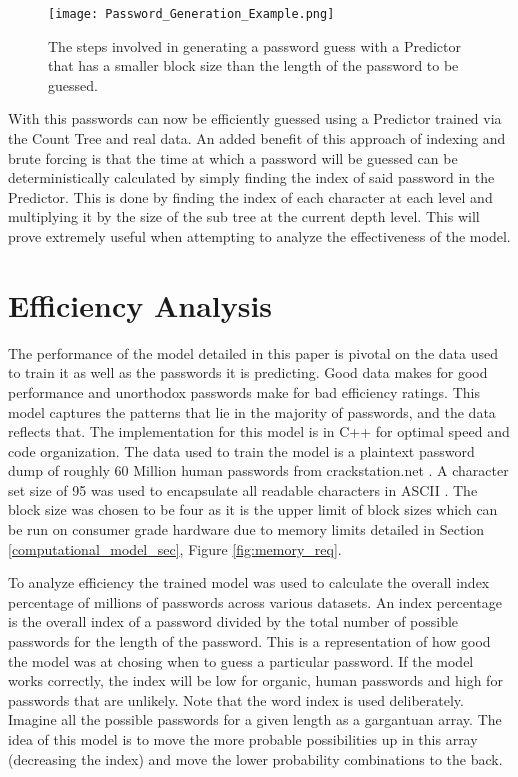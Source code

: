 \documentclass[11pt]{article}
\begin{document}
\begin{figure}[H]
\centering
    \texttt{[image: Password\_Generation\_Example.png]}
\caption{The steps involved in generating a password guess with a Predictor that has a smaller block size than the length of the password to be guessed.}

\label{fig:password_generation}
\end{figure}

With this passwords can now be efficiently guessed using a Predictor trained via the Count Tree and real data. An added benefit of this approach of indexing and brute forcing is that the time at which a password will be guessed can be deterministically calculated by simply finding the index of said password in the Predictor. This is done by finding the index of each character at each level and multiplying it by the size of the sub tree at the current depth level. This will prove  extremely useful when attempting to analyze the effectiveness of the model.

\section{Efficiency Analysis} \label{efficiency_analysis_sec}

The performance of the model detailed in this paper is pivotal on the data used to train it as well as the passwords it is predicting. Good data makes for good performance and unorthodox passwords make for bad efficiency ratings. This model captures the patterns that lie in the majority of passwords, and the data reflects that.
The implementation for this model is in C++ for optimal speed and code organization. The data used to train the model is a plaintext password dump of roughly 60 Million human passwords from crackstation.net \cite{crackstation_passwords}. A character set size of 95 was used to encapsulate all readable characters in ASCII \cite{gorn1963american}. The block size was chosen to be four as it is the upper limit of block sizes which can be run on consumer grade hardware due to memory limits detailed in Section \ref{computational_model_sec}, Figure \ref{fig:memory_req}.

To analyze efficiency the trained model was used to calculate the overall index percentage of millions of passwords across various datasets. An index percentage is the overall index of a password divided by the total number of possible passwords for the length of the password. This is a representation of how good the model was at chosing when to guess a particular password. If the model works correctly, the index will be low for organic, human passwords and high for passwords that are unlikely. Note that the word index is used deliberately. Imagine all the possible passwords for a given length as a gargantuan array. The idea of this model is to move the more probable possibilities up in this array (decreasing the index) and move the lower probability combinations to the back.
\end{document}
